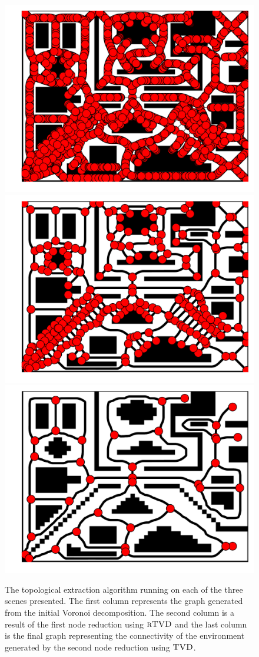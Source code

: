 \documentclass[letterpaper, 10pt, conference]{ieeeconf}
\newcommand{\Function}[1]{\ensuremath{{ \textsc{#1}}}}
\begin{document}
\begin{figure}
    \includegraphics[width=0.32\linewidth]{figs/strongly_connected_vor}
    \includegraphics[width=0.32\linewidth]{figs/strongly_connected_leaves}
    \includegraphics[width=0.32\linewidth]{figs/strongly_connected_TVD}

    \label{fig:process}
    \caption{The topological extraction algorithm running on each of the
        three scenes presented. The first column represents the graph generated
        from the initial Voronoi decomposition. The second column is a result
        of the first node reduction using $\Function{rTVD}$ and the last column
        is the final graph representing the connectivity of the environment
    generated by the second node reduction using $\Function{TVD}$.}
\end{figure}
\end{document}
